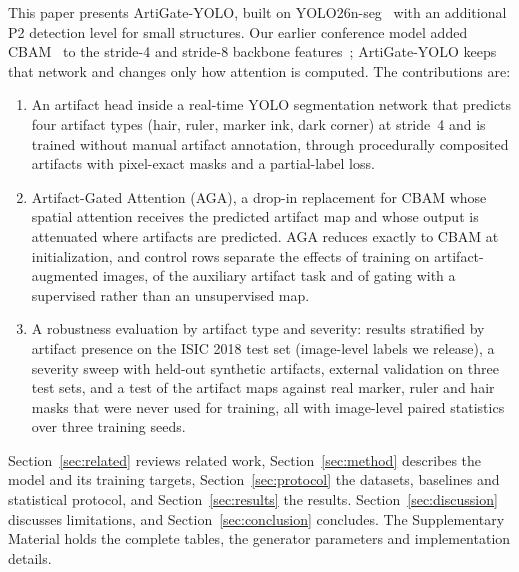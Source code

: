 This paper presents ArtiGate-YOLO, built on YOLO26n-seg~\cite{jocher2026yolo26} with an additional P2 detection level for small structures. Our earlier conference model added CBAM~\cite{woo2018cbam} to the stride-4 and stride-8 backbone features~\cite{iceeis2026own}; ArtiGate-YOLO keeps that network and changes only how attention is computed. The contributions are:
\begin{enumerate}
  \item An artifact head inside a real-time YOLO segmentation network that predicts four artifact types (hair, ruler, marker ink, dark corner) at stride~4 and is trained without manual artifact annotation, through procedurally composited artifacts with pixel-exact masks and a partial-label loss.
  \item Artifact-Gated Attention (AGA), a drop-in replacement for CBAM whose spatial attention receives the predicted artifact map and whose output is attenuated where artifacts are predicted. AGA reduces exactly to CBAM at initialization, and control rows separate the effects of training on artifact-augmented images, of the auxiliary artifact task and of gating with a supervised rather than an unsupervised map.
  \item A robustness evaluation by artifact type and severity: results stratified by artifact presence on the ISIC 2018 test set (image-level labels we release), a severity sweep with held-out synthetic artifacts, external validation on three test sets, and a test of the artifact maps against real marker, ruler and hair masks that were never used for training, all with image-level paired statistics over three training seeds.
\end{enumerate}

Section~\ref{sec:related} reviews related work, Section~\ref{sec:method} describes the model and its training targets, Section~\ref{sec:protocol} the datasets, baselines and statistical protocol, and Section~\ref{sec:results} the results. Section~\ref{sec:discussion} discusses limitations, and Section~\ref{sec:conclusion} concludes. The Supplementary Material holds the complete tables, the generator parameters and implementation details.
